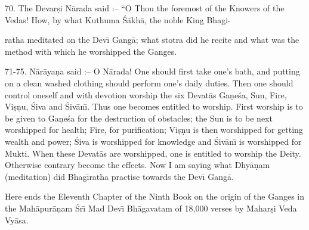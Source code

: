 70. The Devar\d{s}i N\=arada said :-- ``O Thou the foremost of the Knowers of the Vedas! How, by what Kuthuma \'S\=akh\=a, the noble King Bhagi-

ratha meditated on the Dev\={\i} Gang\=a; what stotra did he recite and what was the method with which he worshipped the Ganges.

71-75. N\=ar\=aya\d{n}a said :-- O N\=arada! One should first take one's bath, and putting on a clean washed clothing should perform one's daily duties. Then one should control oneself and with devotion worship the six Devat\=as Ga\d{n}e\'sa, Sun, Fire, Vi\d{s}\d{n}u, \'Siva and \'Siv\=an\={\i}. Thus one becomes entitled to worship. First worship is to be given to Ga\d{n}e\'sa for the destruction of obstacles; the Sun is to be next worshipped for health; Fire, for purification; Vi\d{s}\d{n}u is then worshipped for getting wealth and power; \'Siva is worshipped for knowledge and \'Siv\=an\={\i} is worshipped for Mukti. When these Devat\=as are worshipped, one is entitled to worship the Deity. Otherwise contrary become the effects. Now I am saying what Dhy\=a\d{n}am (meditation) did Bhag\={\i}ratha practise towards the Dev\={\i} Gang\=a.

Here ends the Eleventh Chapter of the Ninth Book on the origin of the Ganges in the Mah\=apur\=a\d{n}am \'Sr\={\i} Mad Dev\={\i} Bh\=agavatam of 18,000 verses by Mahar\d{s}i Veda Vy\=asa.



